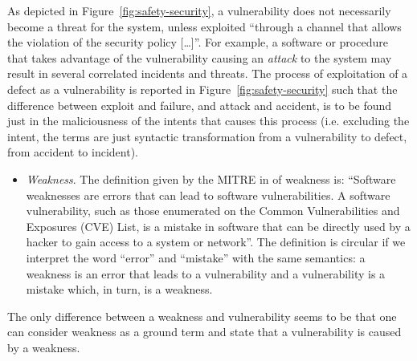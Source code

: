 \documentclass[conference]{IEEEtran}
\begin{document}
As depicted in Figure~\ref{fig:safety-security}, a vulnerability does not
necessarily become a threat for the system, unless exploited ``through a
channel that allows the violation of the security policy
[\ldots]''\autocite{cnssi20104009}. For example, a software or procedure that takes
advantage of the vulnerability causing an \emph{attack} to the system may
result in several correlated incidents and threats.  The process of
exploitation of a defect as a vulnerability is reported in
Figure~\ref{fig:safety-security} such that the difference between exploit and failure,
and attack and accident, is to be found just in the maliciousness of the intents
that causes this process (i.e. excluding the intent, the terms are just syntactic transformation from a vulnerability to defect, from
accident to incident). 

\begin{itemize}
	\item \emph{Weakness}. The definition given by the MITRE
		in \autocite{MITRE2020CWEweakness} of weakness is: ``Software
		weaknesses are errors that can lead to software
		vulnerabilities. A software vulnerability, such as those
		enumerated on the Common Vulnerabilities and Exposures (CVE)
		List, is a mistake in software that can be directly used by a
		hacker to gain access to a system or network''.  The definition
		is circular if we interpret the word ``error'' and ``mistake''
		with the same semantics: a weakness is an error that leads to a
		vulnerability and a vulnerability is a mistake which, in turn,
		is a weakness.  
\end{itemize}

The only difference between a weakness and vulnerability seems to be that one
can consider weakness as a ground term and state that a vulnerability is caused
by a weakness.
\end{document}
